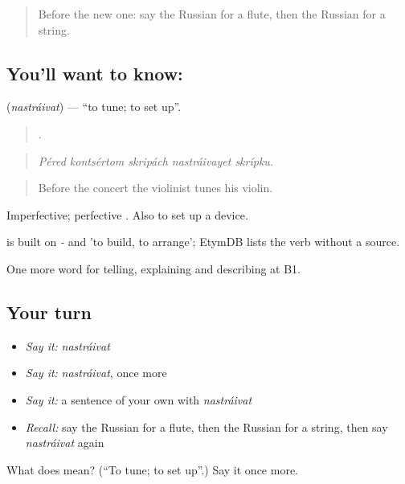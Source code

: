 \label{lesson:RU-C515-nastraivat}



\begin{quote}
Before the new one: say the Russian for a flute, then the Russian for a string.
\end{quote}

\subsection*{You'll want to know: }
\textbf{} (\emph{nastráivat}) — \textquotedblleft{}to tune; to set up\textquotedblright{}.

\begin{quote}
    .
\end{quote}

\begin{quote}
\emph{Péred kontsértom skripách nastráivayet skrípku.}
\end{quote}

\begin{quote}
Before the concert the violinist tunes his violin.
\end{quote}

Imperfective; perfective . Also to set up a device.

\begin{cousinweb}
\emph{} is built on \emph{-} and \emph{} 'to build, to arrange'; EtymDB lists the verb without a source.
\end{cousinweb}

\begin{grammarlens}[title={What you've built}]
One more word for telling, explaining and describing at B1.
\end{grammarlens}

\subsection*{Your turn}
\begin{itemize}
\raggedright
  \item \emph{Say it:} \emph{nastráivat}
  \item \emph{Say it:} \emph{nastráivat}, once more
  \item \emph{Say it:} a sentence of your own with \emph{nastráivat}
  \item \emph{Recall:} say the Russian for a flute, then the Russian for a string, then say \emph{nastráivat} again
\end{itemize}

\begin{tcolorbox}[breakable,colback=teal!4,colframe=teal!35!black,title={Before you move on}]
What does  mean? (\textquotedblleft{}To tune; to set up\textquotedblright{}.) Say it once more.
\end{tcolorbox}
